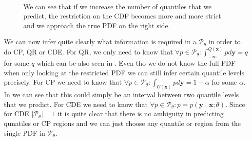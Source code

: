 \begin{figure}
    \centering
    \\

    \caption{We can see that if we increase the number of quantiles that we predict, the restriction on the CDF becomes more and more strict and we approach the true PDF on the right side.}
\end{figure}

We can now infer quite clearly what information is required in a $\mathcal{P}_{\theta}$ in order to do CP, QR or CDE. For QR, we only need to know that $\forall p\in\mathcal{P}_\theta: \int_{-\infty}^{Q(\mathbf{x})} p d\mathbf{y} = q$ for some $q$ which can be also seen in . Even tho we do not know the full PDF when only looking at the restricted PDF we can still infer certain quantile levels precisely. For CP we need to know that $\forall p\in\mathcal{P}_\theta: \int_{U(\mathbf{x})} p d\mathbf{y} = 1 - \alpha$ for some $\alpha$. In  we can see that this could simply be an interval between two quantile levels that we predict. For CDE we need to know that $\forall p\in\mathcal{P}_\theta: p = p(\mathbf{y} \mid \mathbf{x}; \theta)$. Since for CDE $|\mathcal{P}_\theta| = 1$ it is quite clear that there is no ambiguity in predicting qunatiles or CP regions and we can just choose any quantile or region from the single PDF in $\mathcal{P}_\theta$.

